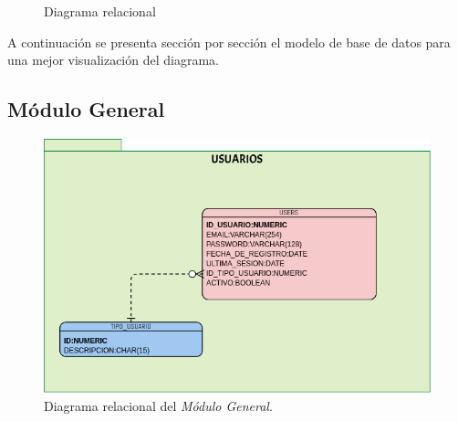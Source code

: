 \begin{figure}[H]
    \begin{center}
    \caption{Diagrama relacional}
    \label{fig:db}
    \end{center}
\end{figure}
\clearpage
A continuación se presenta sección por sección el modelo de base de datos para una mejor visualización del diagrama.


\subsection{Módulo General}

\begin{figure}[hbtp!]
    \begin{center}
        \includegraphics[width=1 \textwidth]{anexos/imagenes/MDGRL.png}
    \end{center}
    
    \caption{Diagrama relacional del \textit{Módulo General}.}
    \label{adcu:grl}
\end{figure}


